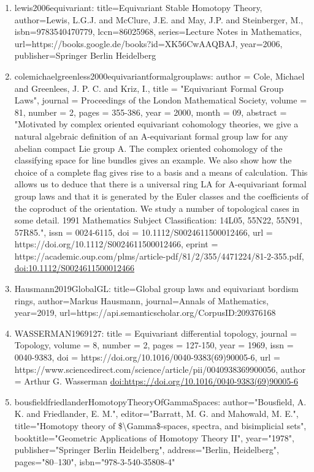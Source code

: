 \documentclass[11pt]{article}
\begin{document}
\begin{enumerate}[leftmargin=*]
  \item lewis2006equivariant: title=Equivariant Stable Homotopy Theory, author=Lewis, L.G.J. and McClure, J.E. and May, J.P. and Steinberger, M., isbn=9783540470779, lccn=86025968, series=Lecture Notes in Mathematics, url=https://books.google.de/books?id=XK56CwAAQBAJ, year=2006, publisher=Springer Berlin Heidelberg
  \item colemichaelgreenless2000equivariantformalgrouplaws: author = Cole, Michael and Greenlees, J. P. C. and Kriz, I., title = "Equivariant Formal Group Laws", journal = Proceedings of the London Mathematical Society, volume = 81, number = 2, pages = 355-386, year = 2000, month = 09, abstract = "Motivated by complex oriented equivariant cohomology theories, we give a natural algebraic definition of an A-equivariant formal group law for any abelian compact Lie group A. The complex oriented cohomology of the classifying space for line bundles gives an example. We also show how the choice of a complete flag gives rise to a basis and a means of calculation. This allows us to deduce that there is a universal ring LA for A-equivariant formal group laws and that it is generated by the Euler classes and the coefficients of the coproduct of the orientation. We study a number of topological cases in some detail. 1991 Mathematics Subject Classification: 14L05, 55N22, 55N91, 57R85.", issn = 0024-6115, doi = 10.1112/S0024611500012466, url = https://doi.org/10.1112/S0024611500012466, eprint = https://academic.oup.com/plms/article-pdf/81/2/355/4471224/81-2-355.pdf, \href{https://doi.org/10.1112/S0024611500012466}{doi:10.1112/S0024611500012466}
  \item Hausmann2019GlobalGL: title=Global group laws and equivariant bordism rings, author=Markus Hausmann, journal=Annals of Mathematics, year=2019, url=https://api.semanticscholar.org/CorpusID:209376168
  \item WASSERMAN1969127: title = Equivariant differential topology, journal = Topology, volume = 8, number = 2, pages = 127-150, year = 1969, issn = 0040-9383, doi = https://doi.org/10.1016/0040-9383(69)90005-6, url = https://www.sciencedirect.com/science/article/pii/0040938369900056, author = Arthur G. Wasserman \href{https://doi.org/https://doi.org/10.1016/0040-9383(69)90005-6}{doi:https://doi.org/10.1016/0040-9383(69)90005-6}
  \item bousfieldfriedlanderHomotopyTheoryOfGammaSpaces: author="Bousfield, A. K. and Friedlander, E. M.", editor="Barratt, M. G. and Mahowald, M. E.", title="Homotopy theory of \$\textbackslash{}Gamma\$-spaces, spectra, and bisimplicial sets", booktitle="Geometric Applications of Homotopy Theory II", year="1978", publisher="Springer Berlin Heidelberg", address="Berlin, Heidelberg", pages="80--130", isbn="978-3-540-35808-4"

\end{enumerate}
\end{document}
